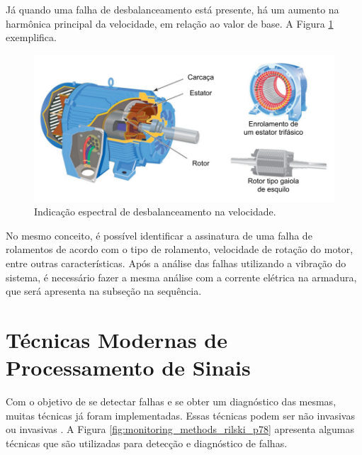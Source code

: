 Já quando uma falha de desbalanceamento está presente, há um aumento na harmônica principal da velocidade, em relação ao valor de base.
A Figura \ref{fig:imbalance_analog_p2} exemplifica.

\begin{figure}[H]
    \caption{Indicação espectral de desbalanceamento na velocidade.}
    \begin{center}
        \includegraphics[scale=0.8, page=7]{referencial/img/imagens_referencial.pdf}
    \end{center}
    \label{fig:imbalance_analog_p2}
\end{figure}

No mesmo conceito, é possível identificar a assinatura de uma falha de rolamentos de acordo com o tipo de rolamento, velocidade de rotação
do motor, entre outras características. Após a análise das falhas utilizando a vibração do sistema, é necessário fazer a mesma análise com a corrente elétrica na armadura, 
que será apresenta na subseção na sequência.



% 

\section{Técnicas Modernas de Processamento de Sinais}\label{sec:}

Com o objetivo de se detectar falhas e se obter um diagnóstico das mesmas, muitas técnicas já foram implementadas. Essas técnicas podem ser
não invasivas ou invasivas \cite{Gorbounov2018}. A Figura \ref{fig:monitoring_methods_rilski_p78} apresenta algumas técnicas que são
utilizadas para detecção e diagnóstico de falhas.

